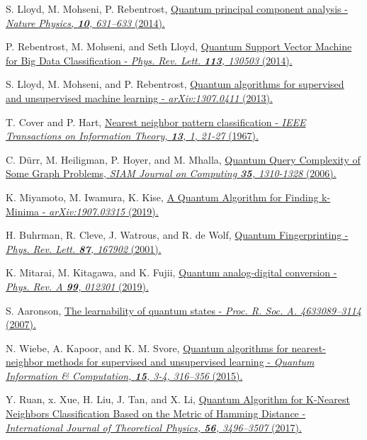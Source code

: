 \documentclass[a4paper,twocolumn,11pt,unpublished]{quantumarticle}
\begin{document}
\begin{thebibliography}{39}
   S. Lloyd, M. Mohseni, P. Rebentrost,
  \href{https://doi.org/10.1038/nphys3029}{Quantum principal component analysis - \textit{Nature Physics, \textbf{10}, 631–633} (2014).}
  
   P. Rebentrost, M. Mohseni, and Seth Lloyd,
  \href{https://doi.org/10.1103/PhysRevLett.113.130503}{Quantum Support Vector Machine for Big Data Classification - \textit{Phys. Rev. Lett. \textbf{113}, 130503} (2014).}
  
   S. Lloyd, M. Mohseni, and P. Rebentrost,
  \href{https://arxiv.org/abs/1307.0411}{Quantum algorithms for supervised and unsupervised machine learning - \textit{arXiv:1307.0411} (2013).}  
  
   T. Cover and P. Hart,
  \href{https://doi.org/10.1109/TIT.1967.1053964}{Nearest neighbor pattern classification - \textit{ IEEE Transactions on Information Theory, \textbf{13}, 1, 21-27} (1967).}

   C. Dürr, M. Heiligman, P. Hoyer, and M. Mhalla,
  \href{https://doi.org/10.1137/050644719}{Quantum Query Complexity of Some Graph Problems, \textit{SIAM Journal on Computing \textbf{35}, 1310-1328} (2006).}
  
   K. Miyamoto, M. Iwamura, K. Kise,
  \href{https://arxiv.org/abs/1907.03315}{A Quantum Algorithm for Finding k-Minima - \textit{arXiv:1907.03315} (2019).}
  
   H. Buhrman, R. Cleve, J. Watrous, and R. de Wolf,
  \href{https://doi.org/10.1103/PhysRevLett.87.167902}{Quantum Fingerprinting - \textit{Phys. Rev. Lett. \textbf{87}, 167902} (2001).}
  
   K. Mitarai, M. Kitagawa, and K. Fujii,
  \href{https://doi.org/10.1103/PhysRevA.99.012301}{Quantum analog-digital conversion - \textit{Phys. Rev. A \textbf{99}, 012301} (2019).}
  
   S. Aaronson,
  \href{https://doi.org/10.1098/rspa.2007.0113}{The learnability of quantum states - \textit{Proc. R. Soc. A. 4633089–3114} (2007).}
  
   N. Wiebe, A. Kapoor, and K. M. Svore,
  \href{https://dl.acm.org/doi/10.5555/2871393.2871400}{Quantum algorithms for nearest-neighbor methods for supervised and unsupervised learning - \textit{Quantum Information \& Computation, \textbf{15}, 3-4, 316–356} (2015).}

 Y. Ruan, x. Xue, H. Liu, J. Tan, and X. Li,
  \href{https://doi.org/10.1007/s10773-017-3514-4}{Quantum Algorithm for K-Nearest Neighbors Classification Based on the Metric of Hamming Distance - \textit{International Journal of Theoretical Physics, \textbf{56}, 3496–3507} (2017).}


\end{thebibliography}
\end{document}

